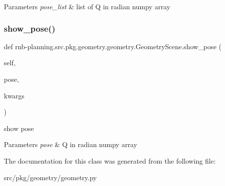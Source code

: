 \begin{DoxyParams}{Parameters}
{\em pose\+\_\+list} & list of Q in radian numpy array \\
\hline
\end{DoxyParams}
\mbox{\label{classrnb-planning_1_1src_1_1pkg_1_1geometry_1_1geometry_1_1_geometry_scene_ac826402b53bcfa3d5adbe3bb888e109a}} 
\subsubsection{\texorpdfstring{show\+\_\+pose()}{show\_pose()}}
{\footnotesize\ttfamily def rnb-\/planning.\+src.\+pkg.\+geometry.\+geometry.\+Geometry\+Scene.\+show\+\_\+pose (\begin{DoxyParamCaption}\item[{}]{self,  }\item[{}]{pose,  }\item[{}]{kwargs }\end{DoxyParamCaption})}



show pose 


\begin{DoxyParams}{Parameters}
{\em pose} & Q in radian numpy array \\
\hline
\end{DoxyParams}


The documentation for this class was generated from the following file\+:\begin{DoxyCompactItemize}
\item 
src/pkg/geometry/geometry.\+py\end{DoxyCompactItemize}
